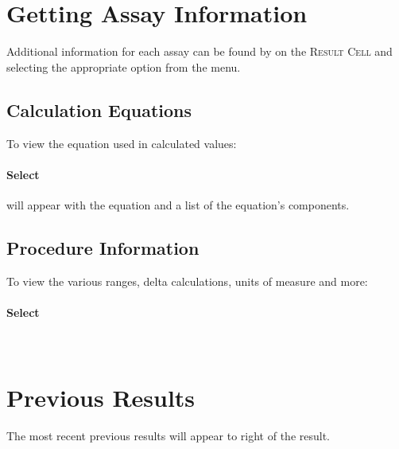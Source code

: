 \section{Getting Assay Information}

Additional information for each assay can be found by  on the \textsc{Result Cell} and selecting the appropriate option from the menu.\\


\subsection{Calculation Equations}
To view the equation used in calculated values:

\paragraph{Select} 

 will appear with the equation and a list of the equation's components.\\


\subsection{Procedure Information\label{subsection:are_show_proc_info}}

To view the various ranges, delta calculations, units of measure and more:

\paragraph{Select} \\



\section{Previous Results}
The most recent previous results will appear to right of the result.\\

